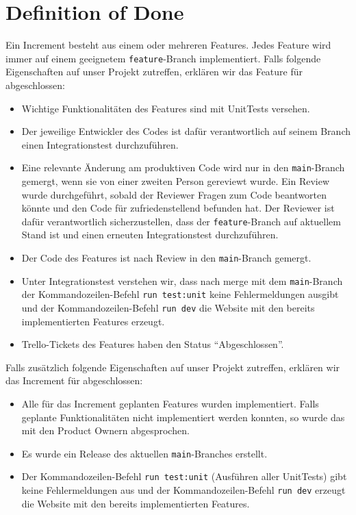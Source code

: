 \documentclass[titlepage]{scrartcl}
\begin{document}
\section{Definition of Done}%
Ein Increment besteht aus einem oder mehreren Features.
Jedes Feature wird immer auf einem geeignetem \texttt{feature}-Branch implementiert.
Falls folgende Eigenschaften auf unser Projekt zutreffen, erklären wir das Feature für abgeschlossen:
\begin{itemize}
	\item Wichtige Funktionalitäten des Features sind mit UnitTests versehen.
	\item Der jeweilige Entwickler des Codes ist dafür verantwortlich auf seinem Branch einen Integrationstest durchzuführen.
	\item Eine relevante Änderung am produktiven Code wird nur in den \texttt{main}-Branch gemergt, wenn sie von einer zweiten Person gereviewt wurde.
			Ein Review wurde durchgeführt, sobald der Reviewer Fragen zum Code beantworten könnte und den Code für zufriedenstellend befunden hat.
			Der Reviewer ist dafür verantwortlich sicherzustellen, dass der \texttt{feature}-Branch auf aktuellem Stand ist und einen erneuten Integrationstest durchzuführen.
	\item Der Code des Features ist nach Review in den \texttt{main}-Branch gemergt.
	\item Unter Integrationstest verstehen wir, dass nach merge mit dem \texttt{main}-Branch der Kommandozeilen-Befehl \texttt{run test:unit} keine Fehlermeldungen ausgibt und der Kommandozeilen-Befehl \texttt{run dev} die Website mit den bereits implementierten Features erzeugt.
	\item Trello-Tickets des Features haben den Status "`Abgeschlossen"'.
\end{itemize}
Falls zusätzlich folgende Eigenschaften auf unser Projekt zutreffen, erklären wir das Increment für abgeschlossen:
\begin{itemize}
	\item Alle für das Increment geplanten Features wurden implementiert. Falls geplante Funktionalitäten nicht implementiert werden konnten, so wurde das mit den Product Ownern abgesprochen.
	\item Es wurde ein Release des aktuellen \texttt{main}-Branches erstellt.
	\item Der Kommandozeilen-Befehl \texttt{run test:unit} (Ausführen aller UnitTests) gibt keine Fehlermeldungen aus und der Kommandozeilen-Befehl \texttt{run dev} erzeugt die Website mit den bereits implementierten Features. %
\end{itemize}
\end{document}
